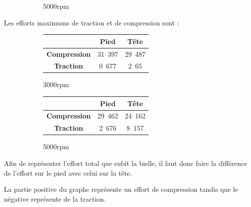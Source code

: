 \documentclass{article}
\begin{document}
\begin{figure}[h]
\begin{subfigure}[b]{0.45\textwidth}
                \caption{\unit{5000}{rpm}}
                \label{fig:forces_5000rpm}
    \end{subfigure}
    \caption{}
\end{figure}


Les efforts maximums de traction et de compression sont :

\begin{figure}[h]
\centering
    \begin{subfigure}[b]{0.45\textwidth}
    		\begin{tabular}{|c|c|c|}
		\hline 
  		& \textbf{Pied} & \textbf{Tête} \\ 
		\hline 
		\textbf{Compression} & \unit{31.397}{ \kilo\newton} & \unit{29.487}{\kilo\newton} \\ 
		\hline 
		\textbf{Traction} & \unit{0.677}{ \kilo\newton} & \unit{2.65}{ \kilo\newton} \\ 
		\hline 
		\end{tabular}
		\caption{\unit{3000}{rpm}}
    \end{subfigure}
    \begin{subfigure}[b]{0.45\textwidth}
        	\begin{tabular}{|c|c|c|}
		\hline 
  		& \textbf{Pied} & \textbf{Tête} \\ 
		\hline 
		\textbf{Compression} & \unit{29.462}{ \kilo\newton} & \unit{24.162}{ \kilo\newton}\\ 
		\hline 
		\textbf{Traction} & \unit{2.676}{ \kilo\newton} & \unit{8.157}{\kilo\newton} \\ 
		\hline 
		\end{tabular} 	
		\caption{\unit{5000}{rpm}}	
    \end{subfigure}
    \caption{}
\end{figure}

Afin de représenter l'effort total que subit la bielle, il faut donc faire la différence de l'effort sur le pied avec celui sur la tête.

La partie positive du graphe représente un effort de compression tandis que le négative représente de la traction.
\end{document}
